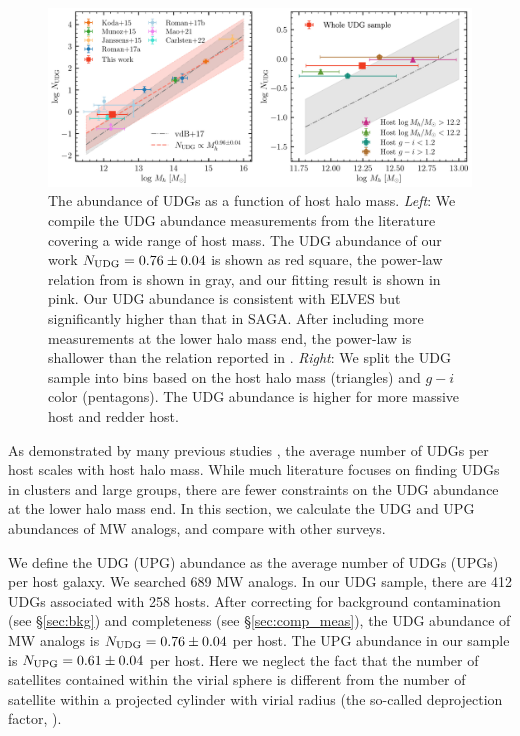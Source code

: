 \documentclass[twocolumn,astrosymb,twocolappendix]{aastex631}
\begin{document}
\begin{CJK*}{UTF8}{gbsn}
\begin{figure}
	\vbox{ 
		\centering
		\includegraphics[width=1\linewidth]{N_UDG_host_mass.pdf}
	}
    \caption{The abundance of UDGs as a function of host halo mass. \textit{Left}: We compile the UDG abundance measurements from the literature covering a wide range of host mass. The UDG abundance of our work $N_{\rm UDG} = 0.76\pm 0.04$ is shown as red square, the power-law relation from \citet{vdBurg2017} is shown in gray, and our fitting result is shown in pink. Our UDG abundance is consistent with ELVES but significantly higher than that in SAGA. After including more measurements at the lower halo mass end, the power-law is shallower than the relation reported in \citet{vdBurg2017}. \textit{Right}: We split the UDG sample into bins based on the host halo mass (triangles) and $g-i$ color (pentagons). The UDG abundance is higher for more massive host and redder host. }
    \label{fig:n_udg}
\end{figure}

As demonstrated by many previous studies \citep[e.g.,][]{vdBurg2016,vdBurg2017,Roman2017a,Karunakaran2022b}, the average number of UDGs per host scales with host halo mass. While much literature focuses on finding UDGs in clusters and large groups, there are fewer constraints on the UDG abundance at the lower halo mass end. In this section, we calculate the UDG and UPG abundances of MW analogs, and compare with other surveys.

We define the UDG (UPG) abundance as the average number of UDGs (UPGs) per host galaxy. We searched 689 MW analogs. In our UDG sample, there are 412 UDGs associated with 258 hosts. After correcting for background contamination (see \S \ref{sec:bkg}) and completeness (see \S \ref{sec:comp_meas}), the UDG abundance of MW analogs is $N_{\rm UDG} = 0.76\pm 0.04$ per host. The UPG abundance in our sample is $N_{\rm UPG} = 0.61\pm 0.04$ per host. Here we neglect the fact that the number of satellites contained within the virial sphere is different from the number of satellite within a projected cylinder with virial radius (the so-called deprojection factor, \citealt{vdBurg2017}).



\end{CJK*}
\end{document}
